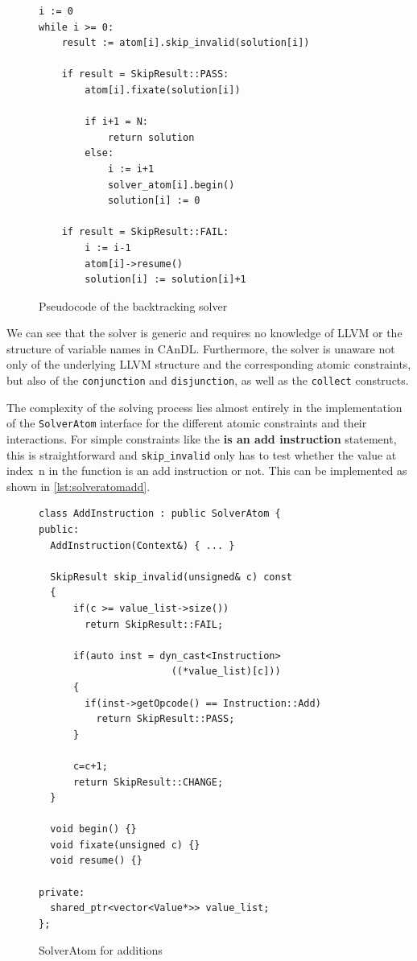 \begin{figure}[t]
\begin{lstlisting}
i := 0
while i >= 0:
    result := atom[i].skip_invalid(solution[i])

    if result = SkipResult::PASS:
        atom[i].fixate(solution[i])

        if i+1 = N:
            return solution
        else:
            i := i+1
            solver_atom[i].begin()
            solution[i] := 0

    if result = SkipResult::FAIL:
        i := i-1
        atom[i]->resume()
        solution[i] := solution[i]+1
\end{lstlisting}
\vspace{-0.3cm}
\caption{Pseudocode of the backtracking solver}
\label{fig:solver}
\end{figure}

    We can see that the solver is generic and requires no knowledge of LLVM or
    the structure of variable names in CAnDL.
    Furthermore, the solver is unaware not only of the underlying LLVM structure
    and the corresponding atomic constraints, but also of the
    \texttt{conjunction} and \texttt{disjunction}, as well as the
    \texttt{collect} constructs.

    The complexity of the solving process lies almost entirely in the
    implementation of the \texttt{SolverAtom} interface for the different atomic
    constraints and their interactions.
    For simple constraints like the \textbf{is an add instruction} statement,
    this is straightforward and \texttt{skip\_invalid} only has to test whether
    the value at \mbox{index n} in the function is an add instruction or not.
    This can be implemented as shown in \autoref{lst:solveratomadd}.

\begin{figure}[ht]
\begin{lstlisting}
class AddInstruction : public SolverAtom {
public:
  AddInstruction(Context&) { ... }

  SkipResult skip_invalid(unsigned& c) const
  {
      if(c >= value_list->size())
        return SkipResult::FAIL;

      if(auto inst = dyn_cast<Instruction>
                       ((*value_list)[c]))
      {
        if(inst->getOpcode() == Instruction::Add)
          return SkipResult::PASS;
      }

      c=c+1;
      return SkipResult::CHANGE;
  }

  void begin() {}
  void fixate(unsigned c) {}
  void resume() {}

private:
  shared_ptr<vector<Value*>> value_list;
};
\end{lstlisting}
\vspace{-0.3cm}
\caption{SolverAtom for additions}
\label{lst:solveratomadd}
\end{figure}

